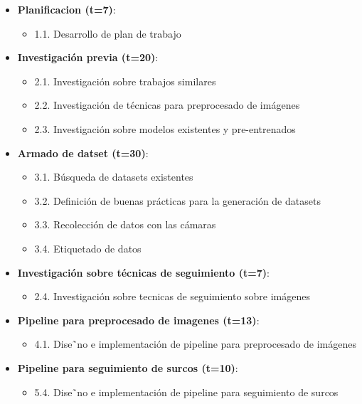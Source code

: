\documentclass[
11pt, %
]{charter}
\begin{document}
\begin{itemize}

\item \textbf{Planificacion (t=7)}:
\begin{itemize}
\item 1.1. Desarrollo de plan de trabajo
\end{itemize}

\item \textbf{Investigación previa (t=20)}:
\begin{itemize}
\item 2.1. Investigación sobre trabajos similares
\item 2.2. Investigación de técnicas para preprocesado de imágenes
\item 2.3. Investigación sobre modelos existentes y pre-entrenados
\end{itemize}

\item \textbf{Armado de datset (t=30)}:
\begin{itemize}
\item 3.1. Búsqueda de datasets existentes
\item 3.2. Definición de buenas prácticas para la generación de datasets
\item 3.3. Recolección de datos con las cámaras
\item 3.4. Etiquetado de datos
\end{itemize}

\item \textbf{Investigación sobre técnicas de seguimiento (t=7)}:
\begin{itemize}
\item 2.4. Investigación sobre tecnicas de seguimiento sobre imágenes
\end{itemize}

\item \textbf{Pipeline para preprocesado de imagenes (t=13)}:
\begin{itemize}
\item 4.1. Dise˜no e implementación de pipeline para preprocesado de imágenes
\end{itemize}

\item \textbf{Pipeline para seguimiento de surcos (t=10)}:
\begin{itemize}
\item 5.4. Dise˜no e implementación de pipeline para seguimiento de surcos
\end{itemize}


\end{itemize}
\end{document}
